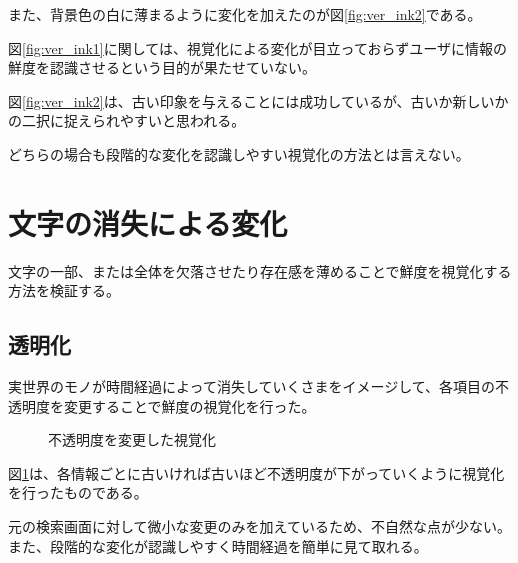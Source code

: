 また、背景色の白に薄まるように変化を加えたのが図\ref{fig:ver_ink2}である。

図\ref{fig:ver_ink1}に関しては、視覚化による変化が目立っておらずユーザに情報の鮮度を認識させるという目的が果たせていない。

図\ref{fig:ver_ink2}は、古い印象を与えることには成功しているが、古いか新しいかの二択に捉えられやすいと思われる。

どちらの場合も段階的な変化を認識しやすい視覚化の方法とは言えない。

\section{文字の消失による変化}
\label{sec:ver_character}

文字の一部、または全体を欠落させたり存在感を薄めることで鮮度を視覚化する方法を検証する。

\subsection{透明化}
\label{subsec:ver_chr_trp}

実世界のモノが時間経過によって消失していくさまをイメージして、各項目の不透明度を変更することで鮮度の視覚化を行った。

\begin{figure}[htbp]
  \begin{center}
  \end{center}
  \caption{不透明度を変更した視覚化}
  \label{fig:ver_transparence}
\end{figure}

図\ref{fig:ver_transparence}は、各情報ごとに古いければ古いほど不透明度が下がっていくように視覚化を行ったものである。

元の検索画面に対して微小な変更のみを加えているため、不自然な点が少ない。また、段階的な変化が認識しやすく時間経過を簡単に見て取れる。

